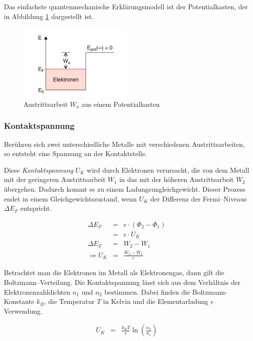 \documentclass[12pt,a4paper]{scrartcl}
\numberwithin{equation}{section} %
\begin{document}
\noindent
Das einfachste quantenmechanische Erklärungsmodell ist der Potentialkasten, der in Abbildung \ref{fig:Austrittsarbeit} dargestellt ist.

\begin{figure}[h!]
	\centering
	\includegraphics[width=0.5\textwidth]{../media/B1.4/Austrittsarbeit_Potentialkasten.jpg}
	\caption{Austrittsarbeit $W_a$ aus einem Potentialkasten \cite{Demtröder}}
	\label{fig:Austrittsarbeit}
\end{figure}

\subsubsection{Kontaktspannung}
Berühren sich zwei unterschiedliche Metalle mit verschiedenen Austrittsarbeiten, so entsteht eine Spannung an der Kontaktstelle.

Diese \emph{Kontaktspannung} $U_K$ wird durch Elektronen verursacht, die von dem Metall mit der geringeren Austrittsarbeit $W_1$ in das mit der höheren Austrittsarbeit $W_2$ übergehen. Dadurch kommt es zu einem Ladungsungleichgewicht. Dieser Prozess endet in einem Gleichgewichtszustand, wenn $U_K$ der Differenz der Fermi--Niveaus $\Delta E_F$ entspricht.

\begin{eqnarray}
	\Delta E_F &=& e \cdot (\Phi _2 - \Phi _1) \\
		&=& e \cdot U_K \\
	\Delta E_F &=& W_2 - W_1 \\
	\Rightarrow U_K &=& \frac{W_2 -W_1}{e}
\end{eqnarray}

\noindent
Betrachtet man die Elektronen im Metall als Elektronengas, dann gilt die Boltzmann--Verteilung. Die Kontaktspannung lässt sich aus dem Verhältnis der Elektronenzahldichten $n_1$ und $n_2$ bestimmen. Dabei finden die Boltzmann-Konstante $k_B$, die Temperatur $T$ in Kelvin und die Elementarladung $e$ Verwendung.

\begin{eqnarray}
	U_K &=& \frac{k_B T}{e} \ln \left( \frac{n_2}{n_1} \right) \label{eq:Kontaktspannung}
\end{eqnarray}
\end{document}

